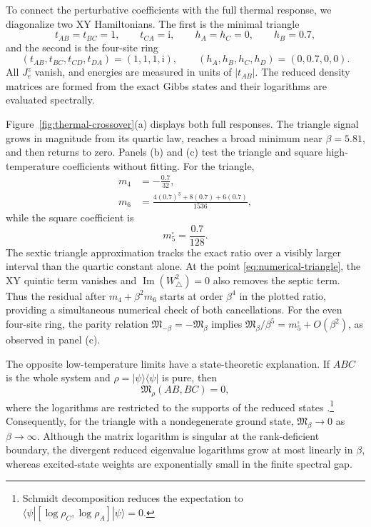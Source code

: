 \documentclass[11pt]{article}
\newcommand{\Mmod}{\mathfrak{M}}
\newcommand{\ii}{\mathrm{i}}
\begin{document}
To connect the perturbative coefficients with the full thermal response, we
diagonalize two XY Hamiltonians.  The first is the minimal
triangle
\begin{equation}
 t_{AB}=t_{BC}=1,\qquad t_{CA}=\ii,\qquad
 h_A=h_C=0,\qquad h_B=0.7,
 \label{eq:numerical-triangle}
\end{equation}
and the second is the four-site ring
\begin{equation}
 (t_{AB},t_{BC},t_{CD},t_{DA})=(1,1,1,\ii),\qquad
 (h_A,h_B,h_C,h_D)=(0,0.7,0,0).
 \label{eq:numerical-square}
\end{equation}
All $J_e^z$ vanish, and energies are measured in units of $|t_{AB}|$.  The
reduced density matrices are formed from the exact Gibbs states and their
logarithms are evaluated spectrally.

Figure~\ref{fig:thermal-crossover}(a) displays both full responses.  The
triangle signal grows in magnitude from its quartic law, reaches a broad
minimum near $\beta=5.81$, and then returns to zero.  Panels (b) and (c) test
the triangle and square high-temperature coefficients without fitting.  For
the triangle,
\begin{align}
 m_4&=-\frac{0.7}{32},\nonumber\\
 m_6&=\frac{4(0.7)^3+8(0.7)+6(0.7)}{1536},
 \label{eq:numerical-m4m6}
\end{align}
while the square coefficient is
\begin{equation}
 m_5^\square=\frac{0.7}{128}.
 \label{eq:numerical-square-m5}
\end{equation}
The sextic triangle approximation tracks the exact ratio over a visibly
larger interval than the quartic constant alone.  At the point
\eqref{eq:numerical-triangle}, the XY quintic term vanishes and
$\operatorname{Im}(W_\triangle^2)=0$ also removes the septic term.  Thus the
residual after $m_4+\beta^2m_6$ starts at order $\beta^4$ in the plotted
ratio, providing a simultaneous numerical check of both cancellations.  For
the even four-site ring, the parity relation
$\Mmod_{-\beta}=-\Mmod_\beta$ implies
$\Mmod_\beta/\beta^5=m_5^\square+O(\beta^2)$, as observed in panel (c).

The opposite low-temperature limits have a state-theoretic explanation.  If
$ABC$ is the whole system and $\rho=|\psi\rangle\langle\psi|$ is pure, then
\begin{equation}
 \Mmod_\rho(AB,BC)=0,
 \label{eq:pure-state-zero}
\end{equation}
where the logarithms are restricted to the supports of the reduced states
\cite{ZouEtAl2022}.\footnote{Schmidt decomposition reduces the expectation to
$\langle\psi|[\log\rho_C,\log\rho_A]|\psi\rangle=0$.}
Consequently, for the triangle with a nondegenerate
ground state, $\Mmod_\beta\to0$ as $\beta\to\infty$.  Although the matrix
logarithm is singular at the rank-deficient boundary, the divergent reduced
eigenvalue logarithms grow at most linearly in $\beta$, whereas excited-state
weights are exponentially small in the finite spectral gap.
\end{document}
